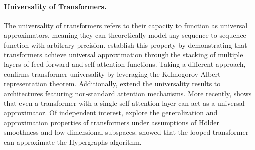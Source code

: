 \paragraph{Universality of Transformers.}
The universality of transformers refers to their capacity to function as universal approximators, meaning they can theoretically model any sequence-to-sequence function with arbitrary precision. \cite{ybr+20} establish this property by demonstrating that transformers achieve universal approximation through the stacking of multiple layers of feed-forward and self-attention functions. Taking a different approach, \cite{jl23} confirms transformer universality by leveraging the Kolmogorov-Albert representation theorem. Additionally, \cite{adtk23} extend the universality results to architectures featuring non-standard attention mechanisms. More recently, \cite{ks24} shows that even a transformer with a single self-attention layer can act as a universal approximator. Of independent interest, \cite{hl24} explore the generalization and approximation properties of transformers under assumptions of Hölder smoothness and low-dimensional subspaces. \cite{lll+25_loop} showed that the looped transformer can approximate the Hypergraphs algorithm. 



